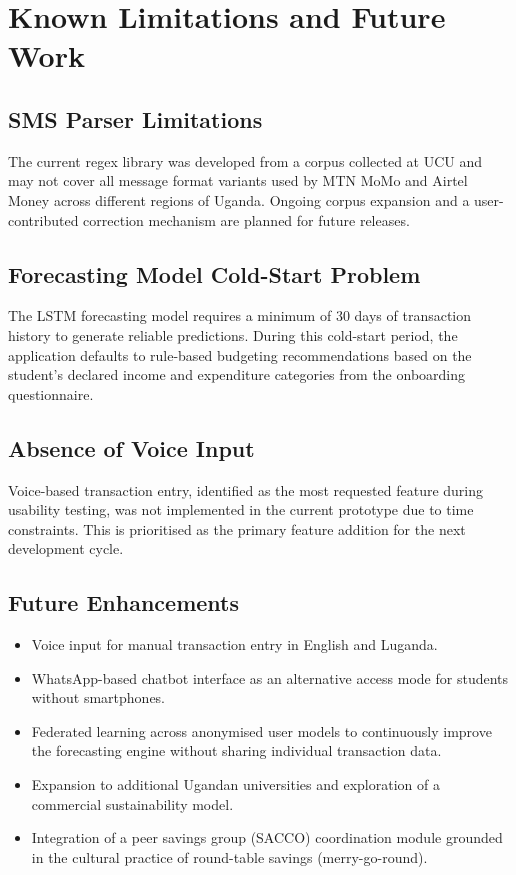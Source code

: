 \documentclass[12pt,a4paper]{report}
\begin{document}
\section{Known Limitations and Future Work}

\subsection{SMS Parser Limitations}

The current regex library was developed from a corpus collected at UCU and may not
cover all message format variants used by MTN MoMo and Airtel Money across different
regions of Uganda. Ongoing corpus expansion and a user-contributed correction
mechanism are planned for future releases.

\subsection{Forecasting Model Cold-Start Problem}

The LSTM forecasting model requires a minimum of 30 days of transaction history to
generate reliable predictions. During this cold-start period, the application defaults to
rule-based budgeting recommendations based on the student's declared income and
expenditure categories from the onboarding questionnaire.

\subsection{Absence of Voice Input}

Voice-based transaction entry, identified as the most requested feature during usability
testing, was not implemented in the current prototype due to time constraints. This is
prioritised as the primary feature addition for the next development cycle.

\subsection{Future Enhancements}

\begin{itemize}
    \item Voice input for manual transaction entry in English and Luganda.
    \item WhatsApp-based chatbot interface as an alternative access mode for students without smartphones.
    \item Federated learning across anonymised user models to continuously improve the forecasting engine without sharing individual transaction data.
    \item Expansion to additional Ugandan universities and exploration of a commercial sustainability model.
    \item Integration of a peer savings group (SACCO) coordination module grounded in the cultural practice of round-table savings (merry-go-round).
\end{itemize}
\end{document}
